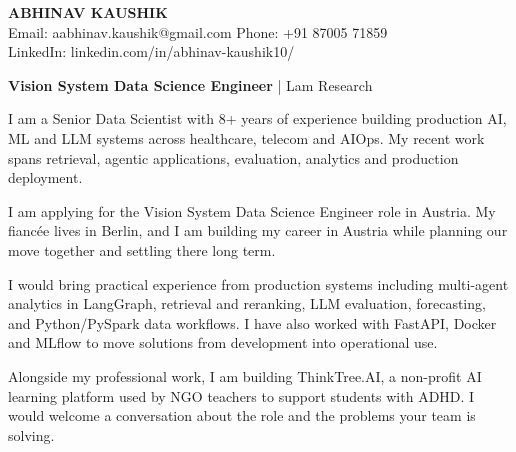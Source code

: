 \documentclass[10pt,a4paper]{article}
\begin{document}
\begin{center}
{\Large\bfseries ABHINAV KAUSHIK}\\[1pt]
Email: aabhinav.kaushik@gmail.com \quad Phone: +91 87005 71859\\
LinkedIn: linkedin.com/in/abhinav-kaushik10/
\end{center}
\vspace{10pt}
\textbf{Vision System Data Science Engineer} | Lam Research\par\vspace{8pt}
I am a Senior Data Scientist with 8+ years of experience building production AI, ML and LLM systems across healthcare, telecom and AIOps. My recent work spans retrieval, agentic applications, evaluation, analytics and production deployment.

I am applying for the Vision System Data Science Engineer role in Austria. My fiancée lives in Berlin, and I am building my career in Austria while planning our move together and settling there long term.

I would bring practical experience from production systems including multi-agent analytics in LangGraph, retrieval and reranking, LLM evaluation, forecasting, and Python/PySpark data workflows. I have also worked with FastAPI, Docker and MLflow to move solutions from development into operational use.

Alongside my professional work, I am building ThinkTree.AI, a non-profit AI learning platform used by NGO teachers to support students with ADHD. I would welcome a conversation about the role and the problems your team is solving.
\end{document}
